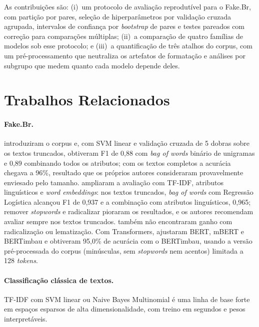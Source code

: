 As contribuições são: (i)~um protocolo de avaliação reprodutível para o Fake.Br, com partição por pares, seleção de hiperparâmetros por validação cruzada agrupada, intervalos de confiança por \emph{bootstrap} de pares e testes pareados com correção para comparações múltiplas; (ii)~a comparação de quatro famílias de modelos sob esse protocolo; e (iii)~a quantificação de três atalhos do corpus, com um pré-processamento que neutraliza os artefatos de formatação e análises por subgrupo que medem quanto cada modelo depende deles.

\section{Trabalhos Relacionados}

\paragraph{Fake.Br.} \citet{monteiro2018} introduziram o corpus e, com SVM linear e validação cruzada de 5 dobras sobre os textos truncados, obtiveram F1 de 0,88 com \emph{bag of words} binário de unigramas e 0,89 combinando todos os atributos; com os textos completos a acurácia chegava a 96\%, resultado que os próprios autores consideraram provavelmente enviesado pelo tamanho. \citet{silva2020} ampliaram a avaliação com TF-IDF, atributos linguísticos e \emph{word embeddings}: nos textos truncados, \emph{bag of words} com Regressão Logística alcançou F1 de 0,937 e a combinação com atributos linguísticos, 0,965; remover \emph{stopwords} e radicalizar pioraram os resultados, e os autores recomendam avaliar sempre nos textos truncados. \citet{calaigian2023} também não encontraram ganho com radicalização ou lematização. Com Transformers, \citet{pires2024} ajustaram BERT, mBERT e BERTimbau e obtiveram 95,0\% de acurácia com o BERTimbau, usando a versão pré-processada do corpus (minúsculas, sem \emph{stopwords} nem acentos) limitada a 128 \emph{tokens}.

\paragraph{Classificação clássica de textos.} TF-IDF \citep{salton1988} com SVM linear \citep{joachims1998} ou Naive Bayes Multinomial \citep{mccallum1998} é uma linha de base forte em espaços esparsos de alta dimensionalidade, com treino em segundos e pesos interpretáveis.

